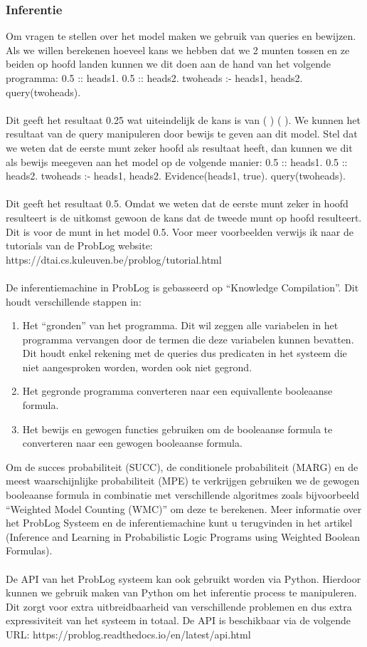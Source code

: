 \documentclass[12pt,a4paper,oneside]{book}
\begin{document}
\subsubsection{Inferentie}
Om vragen te stellen over het model maken we gebruik van queries en bewijzen. Als we willen berekenen hoeveel kans we hebben dat we 2 munten tossen en ze beiden op hoofd landen kunnen we dit doen aan de hand van het volgende programma:
0.5 :: heads1.
0.5 :: heads2.
two\textunderscore heads :- heads1, heads2.
query(two\textunderscore heads).
\\\\
Dit geeft het resultaat 0.25 wat uiteindelijk de kans is van ( ) ( ).
We kunnen het resultaat van de query manipuleren door bewijs te geven aan dit model. Stel dat we weten dat de eerste munt zeker hoofd als resultaat heeft, dan kunnen we dit als bewijs meegeven aan het model op de volgende manier:
0.5 :: heads1.
0.5 :: heads2.
two\textunderscore heads :- heads1, heads2.
Evidence(heads1, true).
query(two\textunderscore heads).
\\\\
Dit geeft het resultaat 0.5. Omdat we weten dat de eerste munt zeker in hoofd resulteert is de uitkomst gewoon de kans dat de tweede munt op hoofd resulteert. Dit is voor de munt in het model 0.5. Voor meer voorbeelden verwijs ik naar de tutorials van de ProbLog website: https://dtai.cs.kuleuven.be/problog/tutorial.html
\\\\
De inferentiemachine in ProbLog is gebasseerd op “Knowledge Compilation”. Dit houdt verschillende stappen in:
\begin{enumerate}
	\item Het “gronden” van het programma. Dit wil zeggen alle variabelen in het programma vervangen door de termen die deze variabelen kunnen bevatten. Dit houdt enkel rekening met de queries dus predicaten in het systeem die niet aangesproken worden, worden ook niet gegrond.
	\item Het gegronde programma converteren naar een equivallente booleaanse formula.
	\item Het bewijs en gewogen functies gebruiken om de booleaanse formula te converteren naar een gewogen booleaanse formula.
\end{enumerate}
Om de succes probabiliteit (SUCC), de conditionele probabiliteit (MARG) en de meest waarschijnlijke probabiliteit (MPE) te verkrijgen gebruiken we de gewogen booleaanse formula in combinatie met verschillende algoritmes zoals bijvoorbeeld “Weighted Model Counting (WMC)” om deze te berekenen. Meer informatie over het ProbLog Systeem en de inferentiemachine kunt u terugvinden in het artikel (Inference and Learning in Probabilistic Logic Programs using Weighted Boolean Formulas).
\\\\
De API van het ProbLog systeem kan ook gebruikt worden via Python. Hierdoor kunnen we gebruik maken van Python om het inferentie process te manipuleren. Dit zorgt voor extra uitbreidbaarheid van verschillende problemen en dus extra expressiviteit van het systeem in totaal. De API is beschikbaar via de volgende URL: https://problog.readthedocs.io/en/latest/api.html
\end{document}
